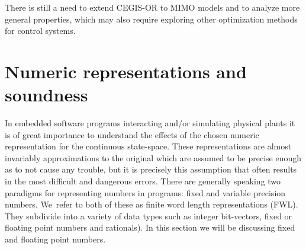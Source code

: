 \documentclass[a4paper,UKenglish]{lipics-v2018}
\begin{document}
There is still a need to extend CEGIS-OR to MIMO models and to analyze more
general properties, which may also require exploring other optimization
methods for control systems.

\newpage


\newpage
\appendix

\section{Numeric representations and soundness} \label{sec:numeric_rep}

In embedded software programs interacting and/or simulating physical plants
it is of great importance to understand the effects of the chosen numeric
representation for the continuous state-space.  These representations are
almost invariably approximations to the original which are assumed to be
precise enough as to not cause any trouble, but it is precisely this
assumption that often results in the most difficult and dangerous errors. 
There are generally speaking two paradigms for representing numbers in
programs: fixed and variable precision numbers.  We~refer to both of these
as finite word length representations (FWL).  They subdivide into a variety
of data types such as integer bit-vectors, fixed or floating point numbers
and rationals).  In this section we will be discussing fixed and floating
point numbers.
\end{document}
